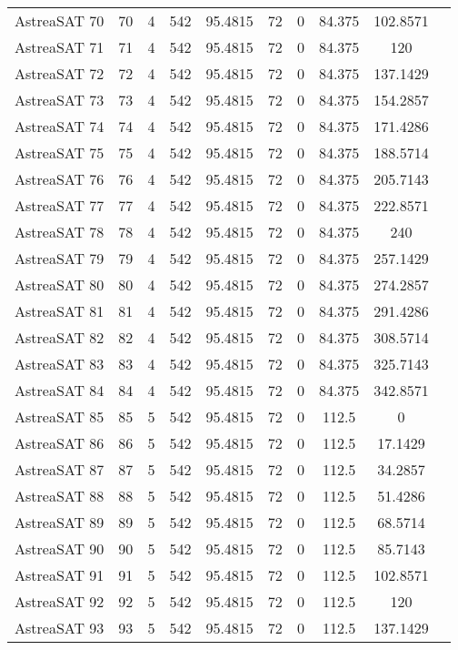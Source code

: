 \begin{longtable}{| c | c | c | c | c | c | c | c | c | c |}
AstreaSAT 70 & 70 & 4 & 542 & 95.4815 & 72 & 0 & 84.375 & 102.8571 \\ 
AstreaSAT 71 & 71 & 4 & 542 & 95.4815 & 72 & 0 & 84.375 & 120 \\ 
AstreaSAT 72 & 72 & 4 & 542 & 95.4815 & 72 & 0 & 84.375 & 137.1429 \\ 
AstreaSAT 73 & 73 & 4 & 542 & 95.4815 & 72 & 0 & 84.375 & 154.2857 \\ 
AstreaSAT 74 & 74 & 4 & 542 & 95.4815 & 72 & 0 & 84.375 & 171.4286 \\ 
AstreaSAT 75 & 75 & 4 & 542 & 95.4815 & 72 & 0 & 84.375 & 188.5714 \\ 
AstreaSAT 76 & 76 & 4 & 542 & 95.4815 & 72 & 0 & 84.375 & 205.7143 \\ 
AstreaSAT 77 & 77 & 4 & 542 & 95.4815 & 72 & 0 & 84.375 & 222.8571 \\ 
AstreaSAT 78 & 78 & 4 & 542 & 95.4815 & 72 & 0 & 84.375 & 240 \\ 
AstreaSAT 79 & 79 & 4 & 542 & 95.4815 & 72 & 0 & 84.375 & 257.1429 \\ 
AstreaSAT 80 & 80 & 4 & 542 & 95.4815 & 72 & 0 & 84.375 & 274.2857 \\ 
AstreaSAT 81 & 81 & 4 & 542 & 95.4815 & 72 & 0 & 84.375 & 291.4286 \\ 
AstreaSAT 82 & 82 & 4 & 542 & 95.4815 & 72 & 0 & 84.375 & 308.5714 \\ 
AstreaSAT 83 & 83 & 4 & 542 & 95.4815 & 72 & 0 & 84.375 & 325.7143 \\ 
AstreaSAT 84 & 84 & 4 & 542 & 95.4815 & 72 & 0 & 84.375 & 342.8571 \\ 
AstreaSAT 85 & 85 & 5 & 542 & 95.4815 & 72 & 0 & 112.5 & 0 \\ 
AstreaSAT 86 & 86 & 5 & 542 & 95.4815 & 72 & 0 & 112.5 & 17.1429 \\ 
AstreaSAT 87 & 87 & 5 & 542 & 95.4815 & 72 & 0 & 112.5 & 34.2857 \\ 
AstreaSAT 88 & 88 & 5 & 542 & 95.4815 & 72 & 0 & 112.5 & 51.4286 \\ 
AstreaSAT 89 & 89 & 5 & 542 & 95.4815 & 72 & 0 & 112.5 & 68.5714 \\ 
AstreaSAT 90 & 90 & 5 & 542 & 95.4815 & 72 & 0 & 112.5 & 85.7143 \\ 
AstreaSAT 91 & 91 & 5 & 542 & 95.4815 & 72 & 0 & 112.5 & 102.8571 \\ 
AstreaSAT 92 & 92 & 5 & 542 & 95.4815 & 72 & 0 & 112.5 & 120 \\ 
AstreaSAT 93 & 93 & 5 & 542 & 95.4815 & 72 & 0 & 112.5 & 137.1429 \\ 

\end{longtable}
